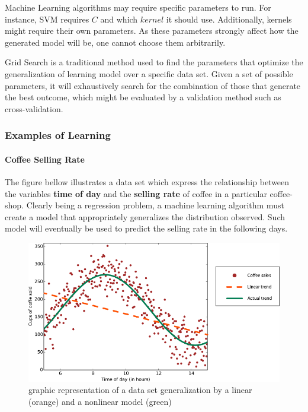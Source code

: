 \documentclass[12pt]{article}
\begin{document}
Machine Learning algorithms may require specific parameters to run. For instance, SVM requires $C$ and which $kernel$ it should use. Additionally, kernels might require their own parameters. As these parameters strongly affect how the generated model will be, one cannot choose them arbitrarily.

Grid Search is a traditional method used to find the parameters that optimize the generalization of learning model over a specific data set. \cite{gridsearch} Given a set of possible parameters, it will exhaustively search for the combination of those that generate the best outcome, which might be evaluated by a validation method such as cross-validation.

\subsubsection{Examples of Learning}

\paragraph{Coffee Selling Rate}

The figure bellow illustrates a data set which express the relationship between the variables \textbf{time of day} and the \textbf{selling rate} of coffee in a particular coffee-shop. Clearly being a regression problem, a machine learning algorithm must create a model that appropriately generalizes the distribution observed. Such model will eventually be used to predict the selling rate in the following days.

\begin{figure}[H]
	\centering
	\captionsetup{justification=centering}

	\includegraphics[scale=.6]{rohrer2015}
	\caption{graphic representation of a data set generalization by a linear (orange) and a nonlinear model (green)}
	\label{fig:rohrer2015}
\end{figure}
\end{document}

